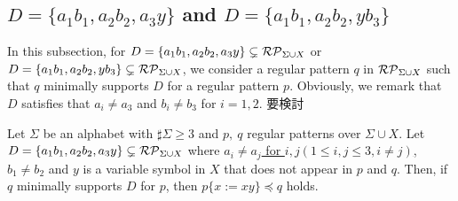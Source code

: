 \subsection{$D = \{ a_{1}b_{1}, a_{2}b_{2}, a_{3}y\}$ and $D = \{ a_{1}b_{1}, a_{2}b_{2}, yb_{3}\}$}\label{subsec:d3b}

{\color{red} In this subsection, for 
$D = \{ a_{1}b_{1}, a_{2}b_{2}, a_{3}y\}\subsetneq \mathcal{RP}_{\Sigma\cup X}$ or $D = \{ a_{1}b_{1}, a_{2}b_{2}, yb_{3}\} \subsetneq \mathcal{RP}_{\Sigma\cup X}$,
we consider a regular pattern $q$ in $\mathcal{RP}_{\Sigma\cup X}$ 
such that $q$ minimally supports $D$ for a regular pattern $p$. %
Obviously, we remark that $D$ satisfies that $a_{i}\neq a_{3}$ and $b_{i}\neq b_{3}$ for $i=1,2$.
}
要検討

\begin{lem}\label{lem:3consts_i}
  Let $\Sigma$ be an alphabet with $\sharp\Sigma \ge 3$ and $p,~q$ regular patterns {\color{red}over} $\Sigma\cup X$.
  {\color{red} Let $D=\{ a_{1}b_{1}, a_{2}b_{2}, a_{3}y\}\subsetneq \mathcal{RP}_{\Sigma\cup X}$
  where \underline{$a_{i}\neq a_{j}$ for $i,j(1\leq i,j\leq 3, i\neq j)$, $b_{1}\neq b_{2}$}
   and $y$ is a variable symbol in $X$ that does not appear in $p$ and $q$.
  Then, %
  if $q$ minimally supports $D$ for $p$,
then $p \{ x := xy \} \preceq q$ holds.}
\end{lem}

